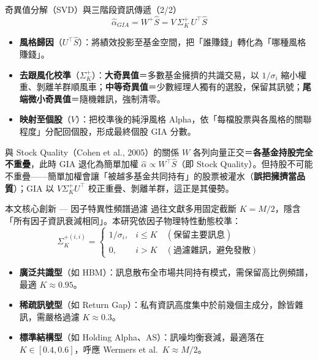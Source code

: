 \documentclass[aspectratio=169,11pt,t]{beamer}   %
\begin{document}
\begin{frame}{奇異值分解（SVD）與三階段資訊傳遞（2/2）}
\vspace{0.0cm}
\setlength\abovedisplayskip{2pt}\setlength\belowdisplayskip{2pt}
\[ \hat\alpha_{GIA}=W^{+}\hat S = V\,\Sigma_K^{+}\,U^{\top}\hat S \]
\begin{itemize}\setlength{\itemsep}{2pt}
  \item \textbf{風格歸因}（$U^{\top}\hat S$）：將績效投影至基金空間，把「誰賺錢」轉化為「哪種風格賺錢」。
  \item \textbf{去跟風化校準}（$\Sigma_K^{+}$）：\textbf{大奇異值}＝多數基金擁擠的共識交易，以 $1/\sigma_i$ 縮小權重、剝離羊群順風車；\textbf{中等奇異值}＝少數經理人獨有的選股，保留其訊號；\textbf{尾端微小奇異值}＝隨機雜訊，強制清零。
  \item \textbf{映射至個股}（$V$）：把校準後的純淨風格 Alpha，依「每檔股票與各風格的關聯程度」分配回個股，形成最終個股 GIA 分數。
\end{itemize}
\vspace{-2pt}
\begin{block}{與 Stock Quality（Cohen et al., 2005）的關係}
\footnotesize $W$ 各列向量正交＝\textbf{各基金持股完全不重疊}，此時 GIA 退化為簡單加權 $\hat\alpha\propto W^{\top}\hat S$（即 Stock Quality）。但持股不可能不重疊——簡單加權會讓「被越多基金共同持有」的股票被灌水（\textbf{誤把擁擠當品質}）；GIA 以 $V\Sigma_K^{+}U^{\top}$ 校正重疊、剝離羊群，這正是其優勢。
\end{block}
\end{frame}

\begin{frame}{本文核心創新 — 因子特異性頻譜過濾}
\vspace{0.1cm}
\small 過往文獻多用固定截斷 $K=M/2$，隱含「所有因子資訊衰減相同」。本研究依因子物理特性動態校準：
\[ \Sigma_K^{+(i,i)}=
\begin{cases} 1/\sigma_i, & i\le K \quad(\text{保留主要訊息})\\[2pt] 0, & i> K \quad(\text{過濾雜訊，避免發散})\end{cases} \]
\begin{itemize}\setlength{\itemsep}{5pt}
  \item \textbf{廣泛共識型}（如 HBM）：訊息散布全市場共同持有模式，需保留高比例頻譜，最適 $K\approx 0.95$。
  \item \textbf{稀疏訊號型}（如 Return Gap）：私有資訊高度集中於前幾個主成分，餘皆雜訊，需嚴格過濾 $K\approx 0.3$。
  \item \textbf{標準結構型}（如 Holding Alpha、AS）：訊噪均衡衰減，最適落在 $K\in[0.4,0.6]$，呼應 Wermers et al.\ $K\approx M/2$。
\end{itemize}
\end{frame}
\end{document}
